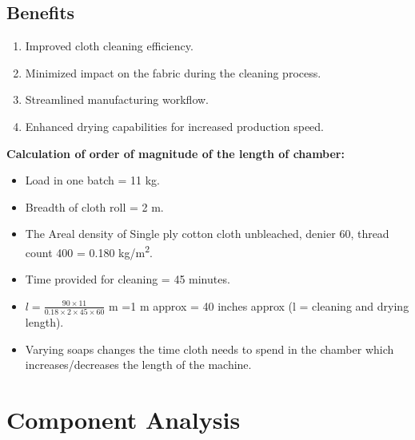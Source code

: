 \documentclass[table,french,english]{rapportCS}
\begin{document}
\subsection{Benefits}
\begin{enumerate}[label=$\bullet$]
    \item Improved cloth cleaning efficiency.
    \item Minimized impact on the fabric during the cleaning process.
    \item Streamlined manufacturing workflow.
    \item Enhanced drying capabilities for increased production speed.
\end{enumerate}
\textbf{Calculation of order of magnitude of the length of chamber:}
\begin{itemize}[label=$\bullet$]
    \item Load in one batch = 11 kg.
    \item Breadth of cloth roll = 2 m.
    \item The \gls{Areal density}  of Single ply cotton cloth unbleached, denier 60, thread count 400 = 0.180 kg/m\textsuperscript{2}.
    \item Time provided for cleaning = 45 minutes.
    \item \( l = \frac{90 \times 11}{0.18 \times 2 \times 45 \times 60} \) m =1 m approx = 40 inches approx (l = cleaning and drying length).
    \item Varying soaps changes the time cloth needs to spend in the chamber which increases/decreases the length of the machine.

\end{itemize}


\section{Component Analysis}\label{sec:compana}
\end{document}
